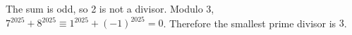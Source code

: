 The sum is odd, so 2 is not a divisor. Modulo 3, $7^{2025}+8^{2025}\equiv1^{2025}+(-1)^{2025}=0$. Therefore the smallest prime divisor is $\boxed3$.
